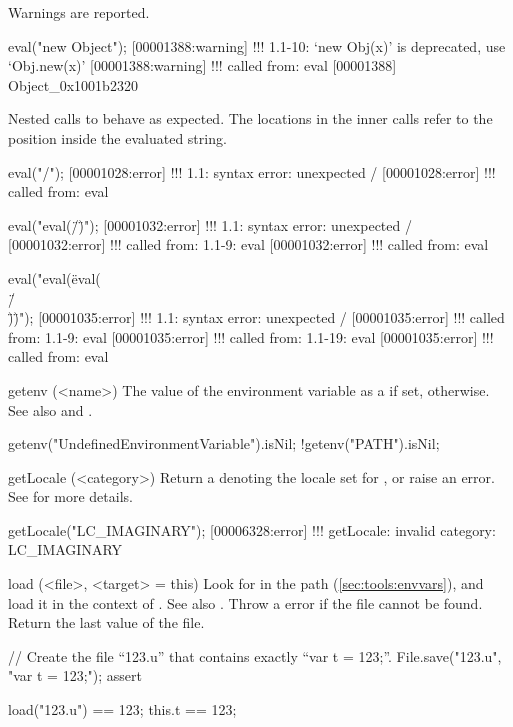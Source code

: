 \begin{urbiscriptapi}
  Warnings are reported.

\begin{urbiscript}
eval("new Object");
[00001388:warning] !!! 1.1-10: `new Obj(x)' is deprecated, use `Obj.new(x)'
[00001388:warning] !!!    called from: eval
[00001388] Object_0x1001b2320
\end{urbiscript}

  Nested calls to  behave as expected.  The locations in the
  inner calls refer to the position inside the evaluated string.

\begin{urbiscript}
eval("/");
[00001028:error] !!! 1.1: syntax error: unexpected /
[00001028:error] !!!    called from: eval

eval("eval(\"/\")");
[00001032:error] !!! 1.1: syntax error: unexpected /
[00001032:error] !!!    called from: 1.1-9: eval
[00001032:error] !!!    called from: eval

eval("eval(\"eval(\\\"/\\\")\")");
[00001035:error] !!! 1.1: syntax error: unexpected /
[00001035:error] !!!    called from: 1.1-9: eval
[00001035:error] !!!    called from: 1.1-19: eval
[00001035:error] !!!    called from: eval
\end{urbiscript}

\item[getenv](<name>)%
  The value of the environment variable  as a 
  if set,  otherwise.  See also  and
  .
\begin{urbiassert}
getenv("UndefinedEnvironmentVariable").isNil;
!getenv("PATH").isNil;
\end{urbiassert}


\item[getLocale](<category>)%
  Return a  denoting the locale set for , or
  raise an error.  See  for more details.
\begin{urbiscript}
getLocale("LC_IMAGINARY");
[00006328:error] !!! getLocale: invalid category: LC_IMAGINARY
\end{urbiscript}


\item[load](<file>, <target> = this)%
  Look for  in the \urbi path (\autoref{sec:tools:envvars}), and
  load it in the context of .  See also .
  Throw a  error if the file cannot be
  found.  Return the last value of the file.
\begin{urbiscript}
// Create the file ``123.u'' that contains exactly ``var t = 123;''.
File.save("123.u", "var t = 123;");
assert
{
  load("123.u") == 123;
  this.t == 123;

}
\end{urbiscript}
\end{urbiscriptapi}
